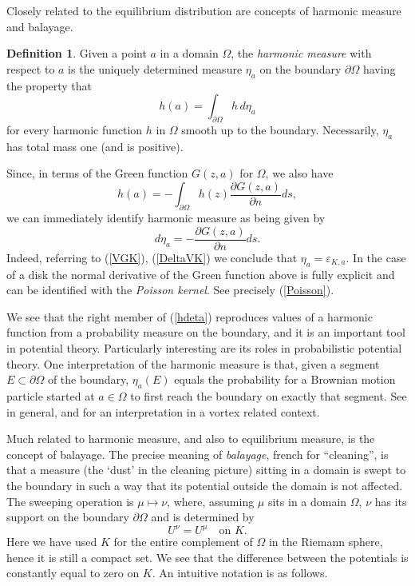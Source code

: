 \documentclass[reqno,12pt]{article}
\theoremstyle{plain}
\theoremstyle{definition}
\newtheorem{definition}{Definition}[section]
\numberwithin{equation}{section}
\numberwithin{figure}{section}
\begin{document}
Closely related to the equilibrium distribution are concepts of {harmonic measure}  and {balayage}. 
\begin{definition}\label{def:harmonic measure}
Given a point $a$ in a domain $\Omega$, the {\it harmonic measure} with respect to $a$ is the uniquely determined measure
$\eta_a$ on the boundary $\partial \Omega$ having the property that
\begin{equation}\label{hdeta}
h(a)=\int_{\partial \Omega} h\, d\eta_a
\end{equation}
for every harmonic function $h$ in $\Omega$ smooth up to the boundary. 
Necessarily, $\eta_a$ has total mass one (and is positive).
\end{definition}

Since, in terms of the Green function $G(z,a)$ for $\Omega$, we also have 
\begin{equation}\label{hdGdn}
h(a)=-\int_{\partial \Omega} h(z)\frac{\partial G(z,a)}{\partial n} ds,
\end{equation}
we can immediately identify harmonic measure as being given by
\begin{equation}\label{dGdn}
d\eta_a=-\frac{\partial G(z,a)}{\partial n} ds.
\end{equation}
Indeed, referring to (\ref{VGK}), (\ref{DeltaVK}) we conclude that $\eta_a=\varepsilon_{K,a}$.
In the case of a disk the normal derivative of the Green function above is fully explicit
and can be identified with the {\it Poisson kernel}. See precisely (\ref{Poisson}).

We see that the right member of  (\ref{hdeta}) reproduces values of a harmonic function  from a probability measure
on the boundary, and it is an important tool in potential theory. Particularly interesting are its
roles in probabilistic potential theory. One interpretation of the harmonic
measure is that, given a segment $E\subset \partial \Omega$ of the boundary,  
$\eta_a(E)$ equals the probability for a Brownian motion particle started at $a\in\Omega$
to first reach the boundary  on exactly that segment.
See \cite{Doob-1984, Bass-1995} in general, and \cite{Grotta-Ragazzo-2024} 
for an interpretation in a vortex related context.

Much related to harmonic measure, and also to equilibrium measure, is the concept of {balayage}.
The precise meaning of {\it balayage}, french for ``cleaning'', is that a measure 
(the `dust' in the cleaning picture) sitting in a domain is swept to the boundary
in such a way that its potential outside the domain is not affected. 
The sweeping operation is $\mu\mapsto \nu$, where, assuming $\mu$ sits in 
a domain $\Omega$, $\nu$ has its support on the boundary $\partial\Omega$ and is determined by
\begin{equation}\label{UUK}
U^\nu=U^\mu \quad \text{on}\,\,K. 
\end{equation}
Here we have used $K$ for the entire complement of $\Omega$ in the Riemann sphere, hence it is still a compact set.
We see that the difference between the potentials is constantly equal to zero on $K$.
An intuitive notation is as follows. 
\end{document}
